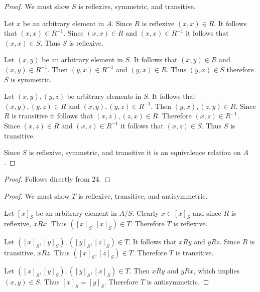 \begin{proof}
    We must show $S$ is reflexive, symmetric, and transitive.

    Let $x$ be an arbitrary element in $A$.
    Since $R$ is reflexive $(x, x) \in R$.
    It follows that $(x, x) \in R^{-1}$.
    Since $(x, x) \in R$ and $(x, x) \in R^{-1}$
        it follows that $(x, x) \in S$.
    Thus $S$ is reflexive.

    Let $(x, y)$ be an arbitrary element in $S$.
    It follows that $(x, y) \in R$ and $(x, y) \in R^{-1}$.
    Then $(y, x) \in R^{-1}$ and $(y, x) \in R$.
    Thus $(y, x) \in S$ therefore $S$ is symmetric.

    Let $(x, y), (y, z)$ be arbitrary elements in $S$.
    It follows that $(x, y), (y, z) \in R$ and $(x, y), (y, z) \in R^{-1}$.
    Then $(y, x), (z, y) \in R$.
    Since $R$ is transitive it follows that $(x, z), (z, x) \in R$.
    Therefore $(x, z) \in R^{-1}$.
    Since $(x, z) \in R$ and $(x, z) \in R^{-1}$
        it follows that $(x, z) \in S$.
    Thus $S$ is transitive.

    Since $S$ is reflexive, symmetric, and transitive it is 
        an equivalence relation on $A$.
\end{proof}

\begin{proof}
    Follows directly from $24$.
\end{proof}

\begin{proof}
    We must show $T$ is reflexive, transitive, and antisymmetric.

    Let $[x]_S$ be an arbitrary element in $A / S$.
    Clearly $x \in [x]_S$ and since $R$ is reflexive, $xRx$.
    Thus $([x]_S, [x]_S) \in T$.
    Therefore $T$ is reflexive.

    Let $([x]_S, [y]_S), ([y]_S, [z]_S) \in T$.
    It follows that $xRy$ and $yRz$.
    Since $R$ is transitive, $xRz$.
    Thus $([x]_S, [z]_S) \in T$.
    Therefore $T$ is transitive.

    Let $([x]_S, [y]_S), ([y]_S, [x]_S) \in T$.
    Then $xRy$ and $yRx$, which implies $(x,y) \in S$.
    Thus $[x]_S = [y]_S$.
    Therefore $T$ is antisymmetric.
\end{proof}